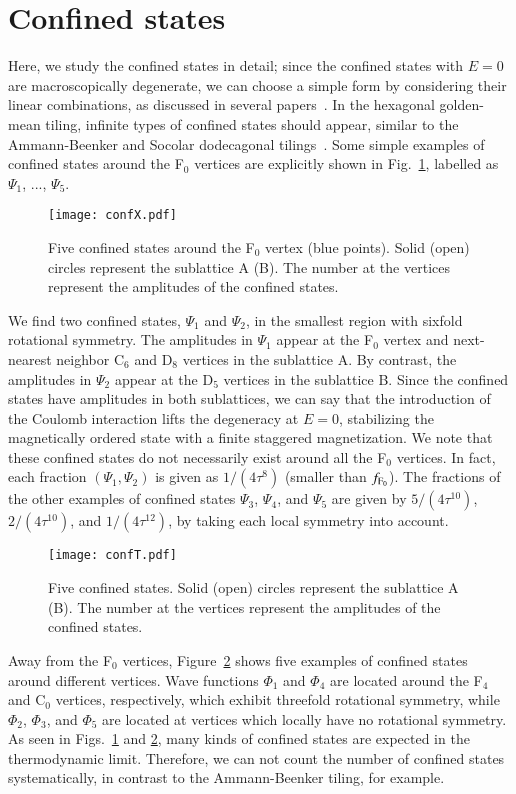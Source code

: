 \documentclass[aps,twocolumn,pra,superscriptaddress,amsmath,amssymb]{revtex4-1}
\begin{document}
\section{Confined states}\label{sec:conf}
Here, we study the confined states in detail; since the confined states with $E=0$ are macroscopically degenerate,
we can choose a simple form by considering their linear combinations,
as discussed in several papers~\cite{KohmotoSutherland,Arai,Koga_Tsunetsugu}.
In the hexagonal golden-mean tiling, 
infinite types of confined states should appear,
similar to the Ammann-Beenker and Socolar dodecagonal tilings~\cite{Koga_AB,Koga_dodeca}.
Some simple examples of confined states around the F$_0$  vertices are
explicitly shown in Fig.~\ref{confX}, labelled as $\Psi_1$, ..., $\Psi_5$.
\begin{figure}[htb]
 \texttt{[image: confX.pdf]}
 \caption{
   Five confined states around the F$_0$ vertex (blue points).
   Solid (open) circles represent the sublattice A (B).
   The number at the vertices represent the amplitudes of the confined states.
 }
 \label{confX}
\end{figure}
We find two confined states, $\Psi_1$ and $\Psi_2$,
in the smallest region with sixfold rotational symmetry.
The amplitudes in $\Psi_1$ appear at the F$_0$ vertex and
next-nearest neighbor C$_6$ and D$_8$ vertices in the sublattice A.
By contrast, the amplitudes in $\Psi_2$
appear at the D$_5$ vertices in the sublattice B.
Since the confined states have amplitudes in both sublattices,
we can say that the introduction of the Coulomb interaction
lifts the degeneracy at $E=0$,
stabilizing the magnetically ordered state with
a finite staggered magnetization.
We note that these confined states do not necessarily exist
around all the F$_0$ vertices.
In fact, each fraction $(\Psi_1, \Psi_2)$ is given as $1/(4\tau^8)$ (smaller than $f_{{\rm F}_0}$).
The fractions of the other examples of confined states $\Psi_3$, $\Psi_4$, and $\Psi_5$ are
given by $5/(4\tau^{10})$, $2/(4\tau^{10})$, and $1/(4\tau^{12})$,
by taking each local symmetry into account.


\begin{figure}[htb]
 \texttt{[image: confT.pdf]}
 \caption{
   Five confined states. Solid (open) circles represent the sublattice A (B).
   The number at the vertices represent the amplitudes of the confined states.
 }
 \label{confT}
\end{figure}
Away from the F$_0$ vertices, Figure~\ref{confT} shows five examples of confined states around different vertices.
Wave functions $\Phi_1$ and $\Phi_4$ are located around
the F$_4$ and C$_0$ vertices, respectively, which exhibit threefold rotational symmetry, while $\Phi_2$, $\Phi_3$, and $\Phi_5$ are located
at vertices which locally have no rotational symmetry.
As seen in Figs.~\ref{confX} and \ref{confT},
many kinds of confined states are expected in the thermodynamic limit.
Therefore, we can not count the number of confined states
systematically, in contrast to the Ammann-Beenker tiling, for example.
\end{document}
